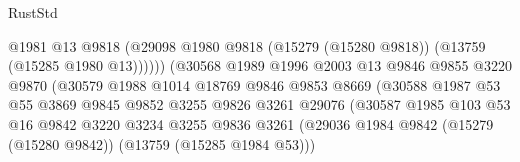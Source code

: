 \begin{lexlean}{RustStd}
\begin{coremodule}
                                            @1981
                                            @13
                                            @9818
                                            (@29098
                                              @1980
                                              @9818
                                              (@15279 (@15280 @9818))
                                              (@13759 (@15285 @1980 @13))))))
                                      (@30568
                                        @1989
                                        @1996
                                        @2003
                                        @13
                                        @9846
                                        @9855
                                        @3220
                                        @9870
                                        (@30579
                                          @1988
                                          @1014
                                          @18769
                                          @9846
                                          @9853
                                          @8669
                                          (@30588
                                            @1987
                                            @53
                                            @55
                                            @3869
                                            @9845
                                            @9852
                                            @3255
                                            @9826
                                            @3261
                                            @29076
                                            (@30587
                                              @1985
                                              @103
                                              @53
                                              @16
                                              @9842
                                              @3220
                                              @3234
                                              @3255
                                              @9836
                                              @3261
                                              (@29036
                                                @1984
                                                @9842
                                                (@15279 (@15280 @9842))
                                                (@13759 (@15285 @1984 @53)))

\end{coremodule}
\end{lexlean}

